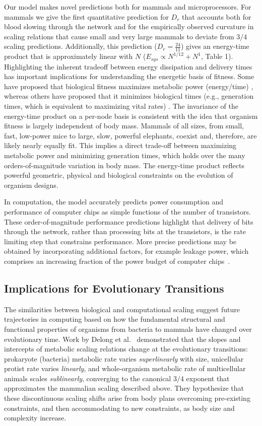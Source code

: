 \documentclass[12pt]{article}
\begin{document}
Our model makes novel predictions both for mammals and
microprocessors. For mammals we give the first quantitative prediction
for $D_r$ that accounts both for blood slowing through the network and
for the empirically observed curvature in scaling relations that cause
small and very large mammals to deviate from $3/4$ scaling predictions. Additionally, 
this prediction ($D_r = \frac{24}{11}$) gives an energy-time product that is approximately linear with $N$ ($E_{sys} \propto N^{1/12} + N^1$, Table 1). Highlighting the inherent tradeoff between energy dissipation and delivery times 
has important implications for understanding the energetic basis of fitness.  Some have proposed that biological fitness
maximizes metabolic power (energy/time) \cite{lotka56, odum71}, whereas others
have proposed that it minimizes biological times (e.g., generation times, which
is equivalent to maximizing vital rates) \cite{lindstedt81, sibly91}. The
invariance of the energy-time product on a per-node basis is
consistent with the idea that organism fitness
is largely independent of body mass.  Mammals of all sizes, from
small, fast, low-power mice to large, slow, powerful elephants, coexist and,
therefore, are likely nearly equally fit.  This implies a direct trade-off
between maximizing metabolic power and minimizing generation times, which holds
over the many orders-of-magnitude variation in body mass.  The energy-time
product reflects powerful geometric, physical and biological constraints on the
evolution of organism designs.

In computation, the model accurately predicts power consumption and
performance of computer chips as simple functions of the number of
transistors. These order-of-magnitude performance predictions highlight that delivery of
bits through the network, rather than processing bits at the
transistors, is the rate limiting step that constrains performance.
More precise predictions may be obtained by incorporating additional
factors, for example leakage power, which comprises an increasing fraction
of the power budget of computer chips~\cite{horowitz2005scaling}.

\subsection{Implications for Evolutionary Transitions}

The similarities between biological and computational scaling suggest
future trajectories in computing based on how the fundamental
structural and functional properties of organisms from bacteria to mammals have changed over
evolutionary time. Work by Delong et
al.~\cite{delong2010shifts} demonstrated that the slopes and
intercepts of metabolic scaling relations change at the evolutionary
	transitions: prokaryote (bacteria) metabolic rate varies \emph{superlinearly}
with size, unicellular protist rate varies  \emph{linearly}, and
whole-organism metabolic rate of multicellular animals scales
 \emph{sublinearly}, converging to the canonical $3/4$ exponent that approximates the mammalian scaling described above. They
hypothesize that these discontinuous scaling shifts arise from body plans
overcoming pre-existing constraints, and then accommodating to new
constraints, as body size and complexity increase.
\end{document}
